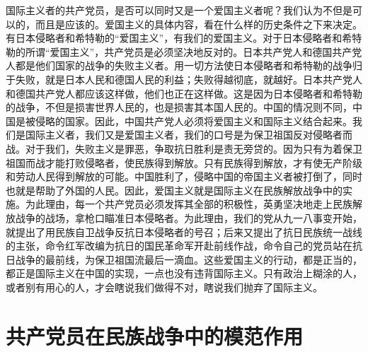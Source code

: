 国际主义者的共产党员，是否可以同时又是一个爱国主义者呢？我们认为不但是可以的，而且是应该的。爱国主义的具体内容，看在什么样的历史条件之下来决定。有日本侵略者和希特勒的“爱国主义”，有我们的爱国主义。对于日本侵略者和希特勒的所谓“爱国主义”，共产党员是必须坚决地反对的。日本共产党人和德国共产党人都是他们国家的战争的失败主义者。用一切方法使日本侵略者和希特勒的战争归于失败，就是日本人民和德国人民的利益；失败得越彻底，就越好。日本共产党人和德国共产党人都应该这样做，他们也正在这样做。这是因为日本侵略者和希特勒的战争，不但是损害世界人民的，也是损害其本国人民的。中国的情况则不同，中国是被侵略的国家。因此，中国共产党人必须将爱国主义和国际主义结合起来。我们是国际主义者，我们又是爱国主义者，我们的口号是为保卫祖国反对侵略者而战。对于我们，失败主义是罪恶，争取抗日胜利是责无旁贷的。因为只有为着保卫祖国而战才能打败侵略者，使民族得到解放。只有民族得到解放，才有使无产阶级和劳动人民得到解放的可能。中国胜利了，侵略中国的帝国主义者被打倒了，同时也就是帮助了外国的人民。因此，爱国主义就是国际主义在民族解放战争中的实施。为此理由，每一个共产党员必须发挥其全部的积极性，英勇坚决地走上民族解放战争的战场，拿枪口瞄准日本侵略者。为此理由，我们的党从九一八事变开始，就提出了用民族自卫战争反抗日本侵略者的号召；后来又提出了抗日民族统一战线的主张，命令红军改编为抗日的国民革命军开赴前线作战，命令自己的党员站在抗日战争的最前线，为保卫祖国流最后一滴血。这些爱国主义的行动，都是正当的，都正是国际主义在中国的实现，一点也没有违背国际主义。只有政治上糊涂的人，或者别有用心的人，才会瞎说我们做得不对，瞎说我们抛弃了国际主义。

\section{共产党员在民族战争中的模范作用}

